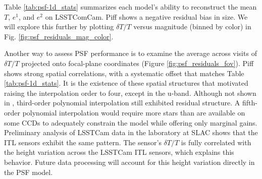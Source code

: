 Table \ref{tab:psf-1d_stats} summarizes each model’s ability to reconstruct 
the mean $T$, $e^1$, and $e^2$ on  LSSTComCam. Piff shows a negative 
residual bias in size. We will explore this further by plotting $\delta T/T$
versus magnitude (binned by color) in Fig. \ref{fig:psf_residuals_mag_color}. 



Another way to assess PSF performance is to examine the average
across visits of $\delta T/T$ projected onto focal-plane coordinates 
(Figure \ref{fig:psf_residuals_fov}). 
Piff shows strong spatial correlations, with a systematic offset 
that matches Table \ref{tab:psf-1d_stats}. It is the existence of these spatial structures that motivated raising the interpolation order to four, except in the u-band. 
Although not shown in , third-order polynomial interpolation still exhibited residual structure. 
A fifth-order polynomial interpolation would require more stars than are available on some CCDs to adequately constrain the model while offering only marginal gains. 
Preliminary analysis of LSSTCam data in the laboratory at SLAC shows that the ITL sensors exhibit the same pattern.
The sensor's $\delta T/T$ is fully correlated with the height variation across the LSSTCam ITL sensors, which explains this behavior. 
Future data processing will account for this height variation directly in the PSF model.
